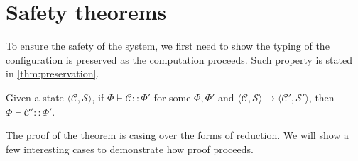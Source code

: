 \documentclass[12pt, openany]{memoir}
\newcommand*{\config}[0]{\mathcal{C}}
\newcommand*{\cancelSet}[0]{\mathcal{S}}
\begin{document}
\section{Safety theorems}
To ensure the safety of the system, we first need to show the typing of the configuration is preserved as the computation proceeds.
Such property is stated in \cref{thm:preservation}.
\begin{theorem}\label{thm:preservation}
  Given a state $\langle \config, \cancelSet \rangle$, if $\Phi \vdash \config :: \Phi'$ for some $\Phi, \Phi'$
  and $\langle \config, \cancelSet \rangle \longrightarrow \langle \config', \cancelSet' \rangle$,
  then $\Phi \vdash \config' :: \Phi'$.
\end{theorem}
The proof of the theorem is casing over the forms of reduction. 
We will show a few interesting cases to demonstrate how proof proceeds.
\end{document}
